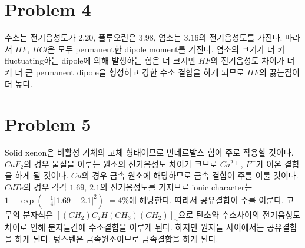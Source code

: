 \documentclass[a4paper]{oblivoir}
\begin{document}
\section{Problem 4}
수소는 전기음성도가 $2.20$, 플루오린은 $3.98$, 염소는  $3.16$의 전기음성도를 가진다. 따라서 $HF$, $HCl$은 모두 permanent한 dipole moment를 가진다. 염소의 크기가 더 커 fluctuating하는 dipole에 의해 발생하는 힘은 더 크지만 $HF$의 전기음성도 차이가 더 커 더 큰 permanent dipole을 형성하고 강한 수소 결합을 하게 되므로 $HF$의 끓는점이 더 높다.

\section{Problem 5}
Solid xenon은 비활성 기체의 고체 형태이므로 반데르발스 힘이 주로 작용할 것이다. $CaF_{2}$의 경우 물질을 이루는 원소의 전기음성도 차이가 크므로 $Ca^{2+}$, $F^{-}$가 이온 결합을 하게 될 것이다. $Cu$의 경우 금속 원소에 해당하므로 금속 결합이 주를 이룰 것이다. $CdTe$의 경우 각각 $1.69$, $2.1$의 전기음성도를 가지므로 ionic character는 $1 - \exp\left( - \frac{1}{4}|1.69-2.1|^{2} \right)$ $=4\%$에 해당한다. 따라서 공유결합이 주를 이룬다. 고무의 분자식은 $[(CH_{2})C_{2}H(CH_{3})(CH_{2})]_{n}$으로 탄소와 수소사이의 전기음성도 차이로 인해 분자들간에 수소결합을 이루게 된다. 하지만 원자들 사이에서는 공유결합을 하게 된다. 텅스텐은 금속원소이므로 금속결합을 하게 된다.
\end{document}
